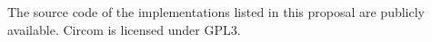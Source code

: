 The source code of the implementations listed in this proposal are publicly available. Circom is licensed under GPL3.


%
